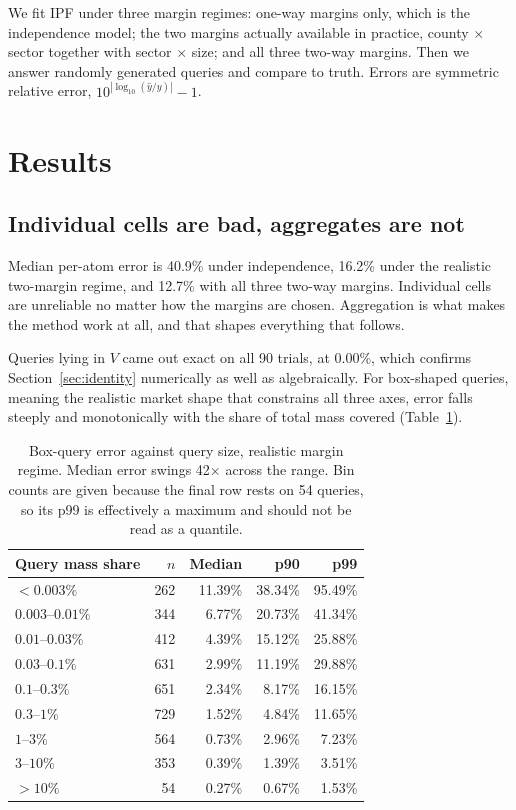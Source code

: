 \documentclass[11pt]{article}
\begin{document}
We fit IPF under three margin regimes: one-way margins only, which is the
independence model; the two margins actually available in practice, county
$\times$ sector together with sector $\times$ size; and all three two-way
margins. Then we answer randomly generated queries and compare to truth. Errors
are symmetric relative error, $10^{|\log_{10}(\hat{y}/y)|} - 1$.

\section{Results}

\subsection{Individual cells are bad, aggregates are not}

Median per-atom error is 40.9\% under independence, 16.2\% under the realistic
two-margin regime, and 12.7\% with all three two-way margins. Individual cells
are unreliable no matter how the margins are chosen. Aggregation is what makes
the method work at all, and that shapes everything that follows.

Queries lying in $V$ came out exact on all 90 trials, at 0.00\%, which confirms
Section~\ref{sec:identity} numerically as well as algebraically. For box-shaped
queries, meaning the realistic market shape that constrains all three axes,
error falls steeply and monotonically with the share of total mass covered
(Table~\ref{tab:span}).

\begin{table}[h]
\centering
\begin{tabular}{lrrrr}
\toprule
Query mass share & $n$ & Median & p90 & p99 \\
\midrule
$<0.003\%$        & 262 & 11.39\% & 38.34\% & 95.49\% \\
$0.003$--$0.01\%$ & 344 &  6.77\% & 20.73\% & 41.34\% \\
$0.01$--$0.03\%$  & 412 &  4.39\% & 15.12\% & 25.88\% \\
$0.03$--$0.1\%$   & 631 &  2.99\% & 11.19\% & 29.88\% \\
$0.1$--$0.3\%$    & 651 &  2.34\% &  8.17\% & 16.15\% \\
$0.3$--$1\%$      & 729 &  1.52\% &  4.84\% & 11.65\% \\
$1$--$3\%$        & 564 &  0.73\% &  2.96\% &  7.23\% \\
$3$--$10\%$       & 353 &  0.39\% &  1.39\% &  3.51\% \\
$>10\%$           &  54 &  0.27\% &  0.67\% &  1.53\% \\
\bottomrule
\end{tabular}
\caption{Box-query error against query size, realistic margin regime. Median
error swings 42$\times$ across the range. Bin counts are given because the final
row rests on 54 queries, so its p99 is effectively a maximum and should not be
read as a quantile.}
\label{tab:span}
\end{table}
\end{document}
